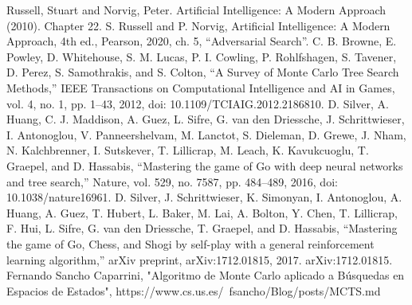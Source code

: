 \documentclass[conference]{IEEEtran}
\begin{document}
\begin{thebibliography}{00}
 Russell, Stuart and Norvig, Peter. Artificial Intelligence: A Modern Approach (2010). Chapter 22.
 S. Russell and P. Norvig, Artificial Intelligence: A Modern Approach, 4th ed., Pearson, 2020, ch. 5, “Adversarial Search”.
 C. B. Browne, E. Powley, D. Whitehouse, S. M. Lucas, P. I. Cowling, P. Rohlfshagen, S. Tavener, D. Perez, S. Samothrakis, and S. Colton, “A Survey of Monte Carlo Tree Search Methods,” IEEE Transactions on Computational Intelligence and AI in Games, vol. 4, no. 1, pp. 1–43, 2012, doi: 10.1109/TCIAIG.2012.2186810.
 D. Silver, A. Huang, C. J. Maddison, A. Guez, L. Sifre, G. van den Driessche, J. Schrittwieser,
I. Antonoglou, V. Panneershelvam, M. Lanctot, S. Dieleman, D. Grewe, J. Nham, N. Kalchbrenner, I. Sutskever, T. Lillicrap, M. Leach, K. Kavukcuoglu, T. Graepel, and D. Hassabis, “Mastering the game of Go with deep neural networks and tree search,” Nature, vol. 529, no. 7587, pp. 484–489, 2016, doi: 10.1038/nature16961.
 D. Silver, J. Schrittwieser, K. Simonyan, I. Antonoglou, A. Huang, A. Guez, T. Hubert, L. Baker, M. Lai, A. Bolton, Y. Chen, T. Lillicrap, F. Hui, L. Sifre, G. van den Driessche, T. Graepel, and D. Hassabis, “Mastering the game of Go, Chess, and Shogi by self-play with a general reinforcement learning algorithm,” arXiv preprint, arXiv:1712.01815, 2017.
arXiv:1712.01815.
 Fernando Sancho Caparrini, "Algoritmo de Monte Carlo aplicado a Búsquedas en Espacios de Estados", https://www.cs.us.es/~fsancho/Blog/posts/MCTS.md

\end{thebibliography}
\end{document}
